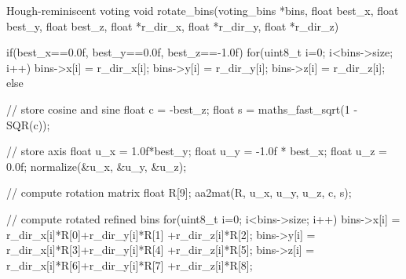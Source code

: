 \newpage
\begin{code}[colback=white, label=algo:rotation]{Hough-reminiscent voting}
void rotate_bins(voting_bins *bins, float best_x, 
						float best_y, float best_z, 
						float *r_dir_x, float *r_dir_y, 
						float *r_dir_z)
{
	if(best_x==0.0f, best_y==0.0f, best_z==-1.0f){
		for(uint8_t i=0; i<bins->size; i++){
			bins->x[i] = r_dir_x[i];
			bins->y[i] = r_dir_y[i];
			bins->z[i] = r_dir_z[i];
		} 
	}
	else{
		// store cosine and sine
		float c = -best_z;
		float s = maths_fast_sqrt(1 - SQR(c)); 

		// store axis
		float u_x = 1.0f*best_y;					
		float u_y = -1.0f * best_x;					
		float u_z = 0.0f;
		normalize(&u_x, &u_y, &u_z);

		// compute rotation matrix
		float R[9];
		aa2mat(R, u_x, u_y, u_z, c, s);

		// compute rotated refined bins
		for(uint8_t i=0; i<bins->size; i++){
			bins->x[i] = r_dir_x[i]*R[0]+r_dir_y[i]*R[1]
							+r_dir_z[i]*R[2];
			bins->y[i] = r_dir_x[i]*R[3]+r_dir_y[i]*R[4]
							+r_dir_z[i]*R[5];
			bins->z[i] = r_dir_x[i]*R[6]+r_dir_y[i]*R[7]
							+r_dir_z[i]*R[8];
		} 
	}
}
\end{code}

\newpage